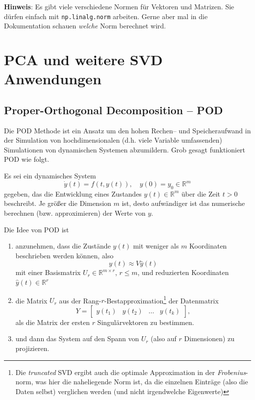 \documentclass[
]{book}
\theoremstyle{definition}
\theoremstyle{definition}
\theoremstyle{definition}
\theoremstyle{definition}
\theoremstyle{remark}
\begin{document}
\textbf{Hinweis}: Es gibt viele verschiedene Normen für Vektoren und Matrizen. Sie dürfen einfach mit \texttt{np.linalg.norm} arbeiten. Gerne aber mal in die Dokumentation schauen \emph{welche} Norm berechnet wird.

\hypertarget{pca-und-weitere-svd-anwendungen}{%
\chapter{PCA und weitere SVD Anwendungen}\label{pca-und-weitere-svd-anwendungen}}

\hypertarget{proper-orthogonal-decomposition-pod}{%
\section{Proper-Orthogonal Decomposition -- POD}\label{proper-orthogonal-decomposition-pod}}

Die POD Methode ist ein Ansatz um den hohen Rechen-- und Speicheraufwand in der
Simulation von hochdimensionalen (d.h. viele Variable umfassenden) Simulationen
von dynamischen Systemen abzumildern.
Grob gesagt funktioniert POD wie folgt.

Es sei ein dynamisches System
\begin{equation*}
\dot y(t) = f(t, y(t)), \quad y(0)=y_0 \in \mathbb R^{m}
\end{equation*}
gegeben, das die Entwicklung eines Zustandes \(y(t)\in \mathbb R^{m}\) über
die Zeit \(t>0\) beschreibt. Je größer die Dimension \(m\) ist, desto
aufwändiger ist das numerische berechnen (bzw. approximieren) der Werte von \(y\).

Die Idee von POD ist

\begin{enumerate}
\def\labelenumi{\arabic{enumi}.}
\item
  anzunehmen, dass die Zustände \(y(t)\) mit weniger
  als \(m\) Koordinaten beschrieben werden können, also
  \begin{equation*}
  y(t) \approx V\hat y(t)
  \end{equation*}
  mit einer Basismatrix \(U_r\in \mathbb R^{m\times r}\), \(r\leq m\), und reduzierten
  Koordinaten \(\hat y(t)\in \mathbb R^{r}\)
\item
  die Matrix \(U_r\) aus der Rang-\(r\)-Bestapproximation\footnote{Die \emph{truncated} SVD
    ergibt auch die optimale Approximation in der \emph{Frobenius}-norm, was hier die
    naheliegende Norm ist, da die einzelnen Einträge (also die Daten selbst)
    verglichen werden (und nicht irgendwelche Eigenwerte)}
  der Datenmatrix
  \begin{equation*}
  Y = \begin{bmatrix}
  y(t_1) & y(t_2) & \hdots & y(t_k)
  \end{bmatrix},
  \end{equation*}
  als die Matrix der ersten \(r\) Singulärvektoren zu bestimmen.
\item
  und dann das System auf den Spann von \(U_r\) (also auf \(r\) Dimensionen) zu
  projizieren.
\end{enumerate}
\end{document}

